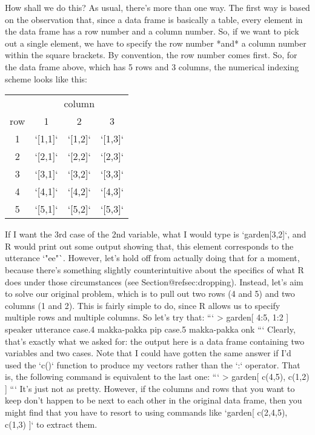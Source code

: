 How shall we do this? As usual, there's more than one way. The first way is based on the observation that, since a data frame is basically a table, every element in the data frame has a row number and a column number. So, if we want to pick out a single element, we have to specify the row number *and* a column number within the square brackets. By convention, the row number comes first. So, for the data frame above, which has 5 rows and 3 columns, the numerical indexing scheme looks like this:
\begin{center}
\begin{tabular}{c|ccc}
& \multicolumn{3}{c}{column} \\
row & 1 & 2 & 3 \\ \hline
1 & `[1,1]` & `[1,2]` & `[1,3]` \\
2 & `[2,1]` & `[2,2]` & `[2,3]` \\
3 & `[3,1]` & `[3,2]` & `[3,3]` \\
4 & `[4,1]` & `[4,2]` & `[4,3]` \\
5 & `[5,1]` & `[5,2]` & `[5,3]` \\
\end{tabular}
\end{center}
If I want the 3rd case of the 2nd variable, what I would type is `garden[3,2]`, and R would print out some output showing that, this element corresponds to the utterance `"ee"`. However, let's hold off from actually doing that for a moment, because there's something slightly counterintuitive about the specifics of what R does under those circumstances (see Section@refsec:dropping). Instead, let's aim to solve our original problem, which is to pull out two rows (4 and 5) and two columns (1 and 2). This is fairly simple to do, since R allows us to specify multiple rows and multiple columns. So let's try that:
```
> garden[ 4:5, 1:2 ]
           speaker utterance
case.4 makka-pakka       pip
case.5 makka-pakka       onk
```
Clearly, that's exactly what we asked for: the output here is a data frame containing two variables and two cases. Note that I could have gotten the same answer if I'd used the `c()` function to produce my vectors rather than the `:` operator. That is, the following command is equivalent to the last one:
```
> garden[ c(4,5), c(1,2) ]
```
It's just not as pretty. However, if the columns and rows that you want to keep don't happen to be next to each other in the original data frame, then you might find that you have to resort to using commands like `garden[ c(2,4,5), c(1,3) ]` to extract them.

